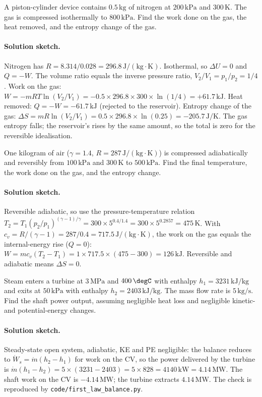 \begin{exercise}
A piston-cylinder device contains $0.5\,\text{kg}$ of nitrogen at
$200\,\text{kPa}$ and $300\,\si{\kelvin}$. The gas is compressed
isothermally to $800\,\text{kPa}$. Find the work done on the gas, the
heat removed, and the entropy change of the gas.
\paragraph{Solution sketch.} Nitrogen has $R = 8.314/0.028 =
296.8\,\text{J}/(\text{kg}\cdot\si{\kelvin})$. Isothermal, so
$\Delta U = 0$ and $Q = -W$. The volume ratio equals the inverse
pressure ratio, $V_2/V_1 = p_1/p_2 = 1/4$. Work on the gas:
$W = -mRT \ln(V_2/V_1) = -0.5 \times 296.8 \times 300 \times \ln(1/4)
= +61.7\,\text{kJ}$. Heat removed: $Q = -W = -61.7\,\text{kJ}$ (rejected
to the reservoir). Entropy change of the gas:
$\Delta S = mR \ln(V_2/V_1) = 0.5 \times 296.8 \times \ln(0.25) =
-205.7\,\text{J}/\si{\kelvin}$. The gas entropy falls; the reservoir's
rises by the same amount, so the total is zero for the reversible
idealisation.
\end{exercise}

\begin{exercise}
One kilogram of air ($\gamma = 1.4$, $R = 287\,\text{J}/(\text{kg}
\cdot\si{\kelvin})$) is compressed adiabatically and reversibly from
$100\,\text{kPa}$ and $300\,\si{\kelvin}$ to $500\,\text{kPa}$. Find
the final temperature, the work done on the gas, and the entropy
change.
\paragraph{Solution sketch.} Reversible adiabatic, so use the
pressure-temperature relation
$T_2 = T_1 (p_2/p_1)^{(\gamma-1)/\gamma} = 300 \times 5^{0.4/1.4} =
300 \times 5^{0.2857} = 475\,\si{\kelvin}$. With
$c_v = R/(\gamma-1) = 287/0.4 = 717.5\,\text{J}/(\text{kg}\cdot
\si{\kelvin})$, the work on the gas equals the internal-energy rise
($Q = 0$): $W = m c_v (T_2 - T_1) = 1 \times 717.5 \times (475 - 300)
= 126\,\text{kJ}$. Reversible and adiabatic means $\Delta S = 0$.
\end{exercise}

\begin{exercise}
Steam enters a turbine at $3\,\text{MPa}$ and $400\,\degC$ with
enthalpy $h_1 = 3231\,\text{kJ}/\text{kg}$ and exits at $50\,\text{kPa}$
with enthalpy $h_2 = 2403\,\text{kJ}/\text{kg}$. The mass flow rate is
$5\,\text{kg}/\text{s}$. Find the shaft power output, assuming
negligible heat loss and negligible kinetic- and potential-energy
changes.
\paragraph{Solution sketch.} Steady-state open system, adiabatic, KE
and PE negligible: the balance reduces to
$\dot{W}_s = \dot{m}(h_2 - h_1)$ for work on the CV, so the power
delivered by the turbine is $\dot{m}(h_1 - h_2) = 5 \times (3231 -
2403) = 5 \times 828 = 4140\,\text{kW} = 4.14\,\text{MW}$. The shaft
work on the CV is $-4.14\,\text{MW}$; the turbine extracts
$4.14\,\text{MW}$. The check is reproduced by
\texttt{code/first\_law\_balance.py}.
\end{exercise}

